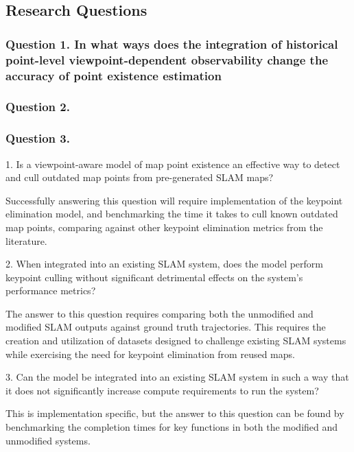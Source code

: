 \subsection{Research Questions}

\subsubsection*{Question 1. In what ways does the integration of historical point-level viewpoint-dependent observability change the accuracy of point existence estimation}

\subsubsection*{Question 2. }
\subsubsection*{Question 3. }


1. Is a viewpoint-aware model of map point existence an effective way to detect and cull outdated map points from pre-generated SLAM maps?

Successfully answering this question will require implementation of the keypoint elimination model, and benchmarking the time it takes to cull known outdated map points, comparing against other keypoint elimination metrics from the literature.


2. When integrated into an existing SLAM system, does the model perform keypoint culling without significant detrimental effects on the system's performance metrics?

The answer to this question requires comparing both the unmodified and modified SLAM outputs against ground truth trajectories. This requires the creation and utilization of datasets designed to challenge existing SLAM systems while exercising the need for keypoint elimination from reused maps.


3. Can the model be integrated into an existing SLAM system in such a way that it does not significantly increase compute requirements to run the system?

This is implementation specific, but the answer to this question can be found by benchmarking the completion times for key functions in both the modified and unmodified systems.